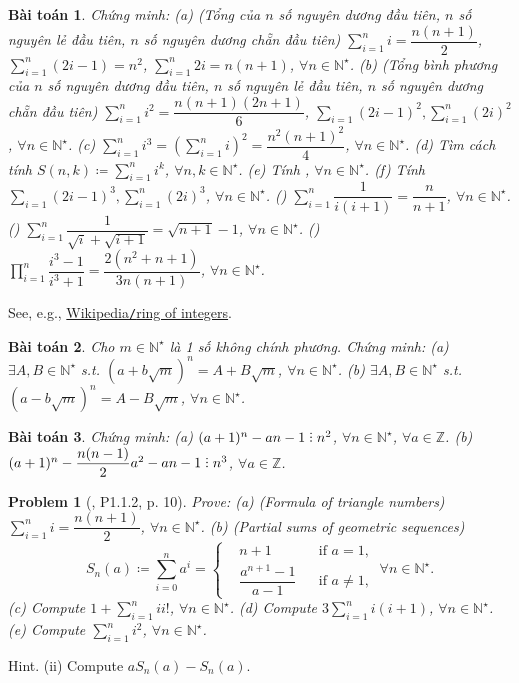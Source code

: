 \documentclass[oneside]{book}
\newtheorem{baitoan}{Bài toán}
\newtheorem{problem}{Problem}
\DeclareRobustCommand{\divby}{%
	\mathrel{\vbox{\baselineskip.65ex\lineskiplimit0pt\hbox{.}\hbox{.}\hbox{.}}}%
}
\begin{document}
\begin{baitoan}
	Chứng minh: (a) {\rm(Tổng của $n$ số nguyên dương đầu tiên, $n$ số nguyên lẻ đầu tiên, $n$ số nguyên dương chẵn đầu tiên)} $\sum_{i=1}^n i = \dfrac{n(n + 1)}{2}$, $\sum_{i=1}^n (2i - 1) = n^2$, $\sum_{i=1}^n 2i = n(n + 1)$, $\forall n\in\mathbb{N}^\star$. (b) {\rm(Tổng bình phương của $n$ số nguyên dương đầu tiên, $n$ số nguyên lẻ đầu tiên, $n$ số nguyên dương chẵn đầu tiên)} $\sum_{i=1}^n i^2 = \dfrac{n(n + 1)(2n + 1)}{6}$, $\sum_{i=1} (2i - 1)^2,\sum_{i=1}^n (2i)^2$, $\forall n\in\mathbb{N}^\star$. (c) $\sum_{i=1}^n i^3 = \left(\sum_{i=1}^n i\right)^2 = \dfrac{n^2(n + 1)^2}{4}$, $\forall n\in\mathbb{N}^\star$. (d) Tìm cách tính $S(n,k)\coloneqq\sum_{i=1}^n i^k$, $\forall n,k\in\mathbb{N}^\star$. (e) Tính , $\forall n\in\mathbb{N}^\star$. (f) Tính $\sum_{i=1} (2i - 1)^3,\sum_{i=1}^n (2i)^3$, $\forall n\in\mathbb{N}^\star$. () $\sum_{i=1}^n \dfrac{1}{i(i + 1)} = \dfrac{n}{n + 1}$, $\forall n\in\mathbb{N}^\star$. () $\sum_{i=1}^n \dfrac{1}{\sqrt{i} + \sqrt{i + 1}} = \sqrt{n + 1} - 1$, $\forall n\in\mathbb{N}^\star$. () $\prod_{i=1}^n \dfrac{i^3 - 1}{i^3 + 1} = \dfrac{2(n^2 + n + 1)}{3n(n + 1)}$, $\forall n\in\mathbb{N}^\star$.
\end{baitoan}
See, e.g., \href{https://en.wikipedia.org/wiki/Ring_of_integers}{Wikipedia{\tt/}ring of integers}.

\begin{baitoan}
	Cho $m\in\mathbb{N}^\star$ là 1 số không chính phương. Chứng minh: (a) $\exists A,B\in\mathbb{N}^\star$ s.t. $(a + b\sqrt{m})^n = A + B\sqrt{m}$, $\forall n\in\mathbb{N}^\star$. (b) $\exists A,B\in\mathbb{N}^\star$ s.t. $(a - b\sqrt{m})^n = A - B\sqrt{m}$, $\forall n\in\mathbb{N}^\star$.
\end{baitoan}

\begin{baitoan}
	Chứng minh: (a) $(a + 1)^n - an - 1\divby n^2$, $\forall n\in\mathbb{N}^\star$, $\forall a\in\mathbb{Z}$. (b) $(a + 1)^n - \dfrac{n(n - 1)}{2}a^2 - an - 1\divby n^3$, $\forall a\in\mathbb{Z}$.
\end{baitoan}

\begin{problem}[\cite{Shahriari2022}, P1.1.2, p. 10]
	Prove: (a) {\rm(Formula of triangle numbers)} $\sum_{i=1}^n i = \dfrac{n(n + 1)}{2}$, $\forall n\in\mathbb{N}^\star$. (b) {\rm(Partial sums of geometric sequences)}
	\begin{equation*}
		S_n(a)\coloneqq\sum_{i=0}^n a^i = \left\{\begin{split}
			&n + 1&&\mbox{if } a = 1,\\
			&\dfrac{a^{n+1} - 1}{a - 1}&&\mbox{if } a\ne1,
		\end{split}\right.\ \forall n\in\mathbb{N}^\star.
	\end{equation*}
	(c) Compute $1 + \sum_{i=1}^n ii!$, $\forall n\in\mathbb{N}^\star$. (d) Compute $3\sum_{i=1}^n i(i + 1)$, $\forall n\in\mathbb{N}^\star$. (e) Compute $\sum_{i=1}^n i^2$, $\forall n\in\mathbb{N}^\star$.
\end{problem}
{\sf Hint.} (ii) Compute $aS_n(a) - S_n(a)$.
\end{document}
